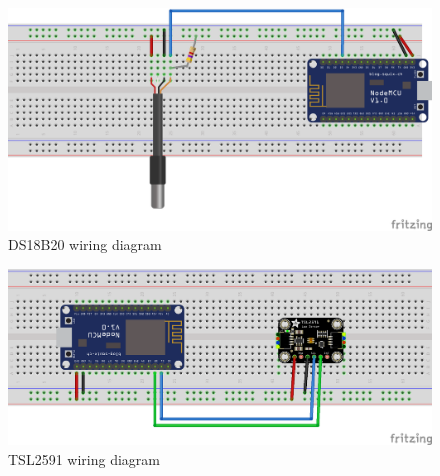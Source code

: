 \begin{figure}[H]
	\centering
	\includegraphics[width=\textwidth]{img/ds18b20_schema.png}
	\caption{DS18B20 wiring diagram}
	\label{fig:ds18b20_schema}
\end{figure}

\begin{figure}[H]
	\centering
	\includegraphics[width=\textwidth]{img/tsl2591_schema.png}
	\caption{TSL2591 wiring diagram}
	\label{fig:tsl2591_schema}
\end{figure}


